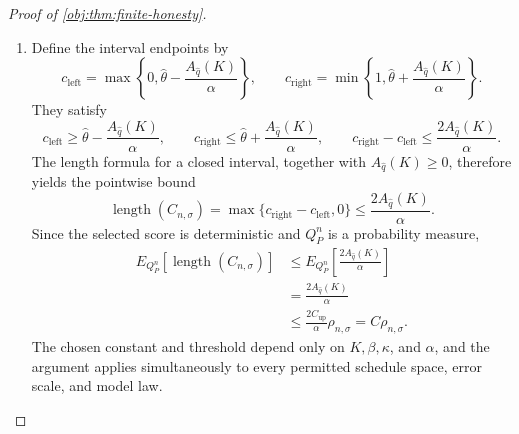 \begin{proof}[Proof of \cref{obj:thm:finite-honesty}]
\begin{enumerate}
Write
\[
L_n=\log(en),
\]
as in \cref{obj:def:frontier-rate}. If \(\sigma\le L_n^{-1/2}\), the Fourier comparison in \cref{obj:thm:observable-upper} supplies a dictionary pair whose score satisfies
\[
A_q(K)\le C_{\mathrm{up}}\rho_{n,\sigma},
\qquad q\in\mathcal D_{n,\sigma}.
\]
The minimizing property consequently gives
\[
A_{\widehat q}(K)\le A_q(K)\le C_{\mathrm{up}}\rho_{n,\sigma}.
\]
If \(L_n^{-1/2}<\sigma\), the polynomial comparison supplies a dictionary pair with
\[
A_q(K)\le C_{\mathrm{up}}\rho_{n,\sigma},
\qquad q\in\mathcal D_{n,\sigma},
\]
and again
\[
A_{\widehat q}(K)\le A_q(K)\le C_{\mathrm{up}}\rho_{n,\sigma}.
\]
These two cases exhaust the allowed error scales. Dictionary admissibility and the score formula also give
\[
A_{\widehat q}(K)\ge2\sqrt{\frac3n}>0.
\]

\item Define the interval endpoints by
\[
c_{\mathrm{left}}
=\max\!\left\{0,\widehat\theta-\frac{A_{\widehat q}(K)}{\alpha}\right\},
\qquad
c_{\mathrm{right}}
=\min\!\left\{1,\widehat\theta+\frac{A_{\widehat q}(K)}{\alpha}\right\}.
\]
They satisfy
\[
c_{\mathrm{left}}\ge\widehat\theta-\frac{A_{\widehat q}(K)}{\alpha},
\qquad
c_{\mathrm{right}}\le\widehat\theta+\frac{A_{\widehat q}(K)}{\alpha},
\qquad
c_{\mathrm{right}}-c_{\mathrm{left}}\le\frac{2A_{\widehat q}(K)}{\alpha}.
\]
The length formula for a closed interval, together with
\(A_{\widehat q}(K)\ge0\), therefore yields the pointwise bound
\[
\operatorname{length}(C_{n,\sigma})
=\max\{c_{\mathrm{right}}-c_{\mathrm{left}},0\}
\le\frac{2A_{\widehat q}(K)}{\alpha}.
\]
Since the selected score is deterministic and \(Q_P^n\) is a probability measure,
\[
\begin{aligned}
E_{Q_P^n}\!\left[\operatorname{length}(C_{n,\sigma})\right]
&\le E_{Q_P^n}\!\left[\frac{2A_{\widehat q}(K)}{\alpha}\right]\\
&=\frac{2A_{\widehat q}(K)}{\alpha}\\
&\le\frac{2C_{\mathrm{up}}}{\alpha}\rho_{n,\sigma}
=C\rho_{n,\sigma}.
\end{aligned}
\]
The chosen constant and threshold depend only on \(K,\beta,\kappa\), and \(\alpha\), and the argument applies simultaneously to every permitted schedule space, error scale, and model law.
\end{enumerate}
\end{proof}

